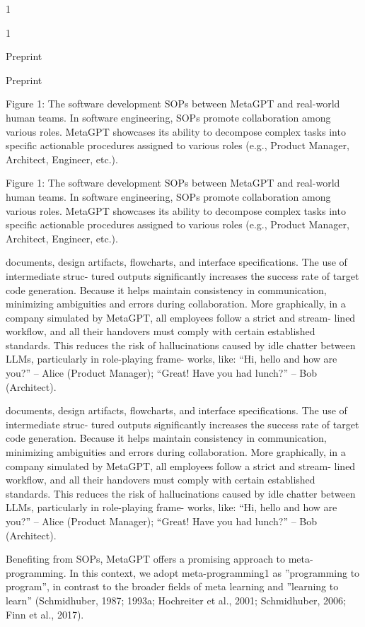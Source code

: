 \documentclass[12pt]{article}
\begin{document}
1


1


Preprint


Preprint


Figure 1: The software development SOPs between MetaGPT and real-world human teams.
In software engineering, SOPs promote collaboration among various roles. MetaGPT showcases
its ability to decompose complex tasks into specific actionable procedures assigned to various roles
(e.g., Product Manager, Architect, Engineer, etc.).


Figure 1: The software development SOPs between MetaGPT and real-world human teams.
In software engineering, SOPs promote collaboration among various roles. MetaGPT showcases
its ability to decompose complex tasks into specific actionable procedures assigned to various roles
(e.g., Product Manager, Architect, Engineer, etc.).


documents, design artifacts, flowcharts, and interface specifications. The use of intermediate struc-
tured outputs significantly increases the success rate of target code generation. Because it helps
maintain consistency in communication, minimizing ambiguities and errors during collaboration.
More graphically, in a company simulated by MetaGPT, all employees follow a strict and stream-
lined workflow, and all their handovers must comply with certain established standards. This reduces
the risk of hallucinations caused by idle chatter between LLMs, particularly in role-playing frame-
works, like: “Hi, hello and how are you?” – Alice (Product Manager); “Great! Have you had
lunch?” – Bob (Architect).


documents, design artifacts, flowcharts, and interface specifications. The use of intermediate struc-
tured outputs significantly increases the success rate of target code generation. Because it helps
maintain consistency in communication, minimizing ambiguities and errors during collaboration.
More graphically, in a company simulated by MetaGPT, all employees follow a strict and stream-
lined workflow, and all their handovers must comply with certain established standards. This reduces
the risk of hallucinations caused by idle chatter between LLMs, particularly in role-playing frame-
works, like: “Hi, hello and how are you?” – Alice (Product Manager); “Great! Have you had
lunch?” – Bob (Architect).


Benefiting from SOPs, MetaGPT offers a promising approach to meta-programming. In this context,
we adopt meta-programming1 as ”programming to program”, in contrast to the broader fields of meta
learning and ”learning to learn” (Schmidhuber, 1987; 1993a; Hochreiter et al., 2001; Schmidhuber,
2006; Finn et al., 2017).
\end{document}

